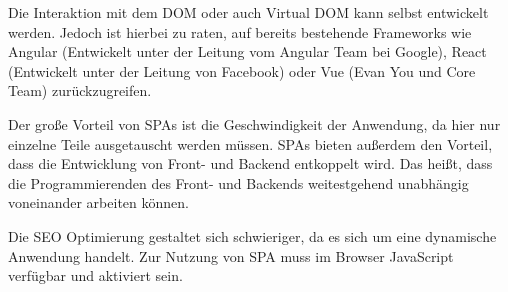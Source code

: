 Die Interaktion mit dem DOM oder auch Virtual DOM kann selbst entwickelt werden. Jedoch ist hierbei zu raten, auf bereits bestehende Frameworks wie Angular (Entwickelt unter der Leitung vom Angular Team bei Google), React (Entwickelt unter der Leitung von Facebook) oder Vue (Evan You und Core Team) zurückzugreifen. 

Der große Vorteil von SPAs ist die Geschwindigkeit der Anwendung, da hier nur einzelne Teile ausgetauscht werden müssen. SPAs bieten außerdem den Vorteil, dass die Entwicklung von Front- und Backend entkoppelt wird. Das heißt, dass die Programmierenden des Front- und Backends weitestgehend unabhängig voneinander arbeiten können.

Die SEO Optimierung gestaltet sich schwieriger, da es sich um eine dynamische Anwendung handelt.
Zur Nutzung von SPA muss im Browser JavaScript verfügbar und aktiviert sein.

